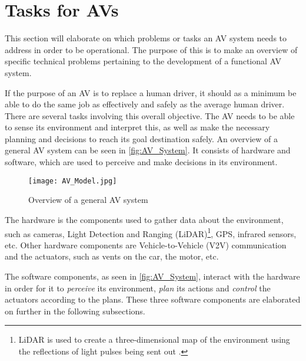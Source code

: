\section{Tasks for AVs}\label{sec:probAnal-tasksAV}
This section will elaborate on which problems or tasks an AV system needs to address in order to be operational.
The purpose of this is to make an overview of specific technical problems pertaining to the development of a functional AV system.

If the purpose of an AV is to replace a human driver, it should as a minimum be able to do the same job as effectively and safely as the average human driver.
There are several tasks involving this overall objective.
The AV needs to be able to sense its environment and interpret this, as well as make the necessary planning and decisions to reach its goal destination safely.
An overview of a general AV system can be seen in \autoref{fig:AV_System}.
It consists of hardware and software, which are used to perceive and make decisions in its environment.

\begin{figure} [H]
    \centering
    \texttt{[image: AV\_Model.jpg]}
    \caption{Overview of a general AV system \cite{pendleton_perception_2017}}
    \label{fig:AV_System}
\end{figure}

The hardware is the components used to gather data about the environment, such as cameras, Light Detection and Ranging (LiDAR)\footnote{LiDAR is used to create a three-dimensional map of the environment using the reflections of light pulses being sent out \cite{pendleton_perception_2017}.}, GPS, infrared sensors, etc.
Other hardware components are Vehicle-to-Vehicle (V2V) communication and the actuators, such as vents on the car, the motor, etc.

The software components, as seen in \autoref{fig:AV_System}, interact with the hardware in order for it to \textit{perceive} its environment, \textit{plan} its actions and \textit{control} the actuators according to the plans.
These three software components are elaborated on further in the following subsections.

